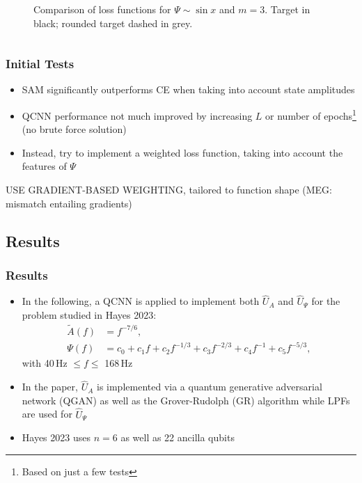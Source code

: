 \documentclass{beamer}
\begin{document}
\begin{frame}
\begin{columns}
\begin{column}{0.5\textwidth}
\begin{figure}[h]
\caption{Comparison of loss functions for $\Psi \sim \sin x$ and $m=3$. Target in black; rounded target dashed in grey.}
\end{figure}
\end{column}
\end{columns}
\end{frame}

\begin{frame}
\frametitle{Initial Tests}
\begin{itemize}
\item \alert{SAM} significantly \alert{outperforms CE} when taking into account state amplitudes 
\item QCNN performance not much improved by increasing $L$ or number of epochs\footnote{Based on just a few tests} (\alert{no brute force solution})
\item Instead, try to implement a \alert{weighted loss function}, taking into account the features of $\Psi$

\end{itemize}

USE GRADIENT-BASED WEIGHTING, tailored to function shape (\alert{MEG}: mismatch entailing gradients)
\end{frame}

\begin{frame}
\section{Results}
\frametitle{Results}
\begin{itemize}
\item In the following, a QCNN is applied to implement both $\hat{U}_A$ and $\hat{U}_\Psi$ for the problem studied in Hayes 2023:
\begin{align}
\tilde{A}(f) &= f^{-7/6}, \\
\Psi(f) &= c_0 + c_1 f + c_2 f^{-1/3} + c_3 f^{-2/3} + c_4 f^{-1} + c_5 f^{-5/3},
\end{align}
with 40$\,$Hz $\leq f \leq $ 168$\,$Hz
\item In the paper, $\hat{U}_A$ is implemented via a quantum generative adversarial network (\alert{QGAN}) as well as the Grover-Rudolph (\alert{GR}) algorithm while \alert{LPFs} are used for $\hat{U}_\Psi$
\item Hayes 2023 uses $n=6$ as well as 22 ancilla qubits 
\end{itemize}
\end{frame}
\end{document}
